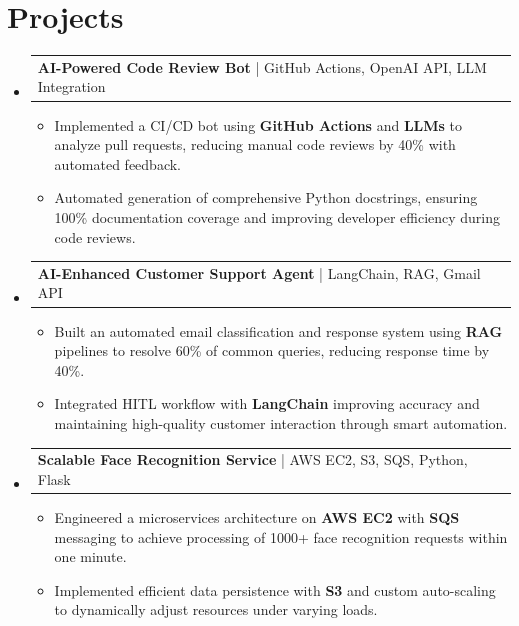 \documentclass[letterpaper,11pt]{article}
\makeatletter
\newcommand{\resumeItem}[1]{
  \item\footnotesize{
    {#1 \vspace{-2pt}}
  }
}
\newcommand{\resumeProjectHeading}[2]{
    \item
    \begin{tabular*}{1.001\textwidth}{l@{\extracolsep{\fill}}r}
      \small#1 & \textbf{\small #2}\\
    \end{tabular*}\vspace{-7pt}
}
\newcommand{\resumeSubHeadingListStart}{\begin{itemize}[leftmargin=0pt, label={}]}
\newcommand{\resumeSubHeadingListEnd}{\end{itemize}}
\newcommand{\resumeItemListStart}{\begin{itemize}[leftmargin=*]}
\newcommand{\resumeItemListEnd}{\end{itemize}\vspace{-5pt}}
\makeatother
\begin{document}
\section{Projects}
    \vspace{-5pt}
    \resumeSubHeadingListStart
          \resumeProjectHeading
              {\textbf{AI-Powered Code Review Bot} | GitHub Actions, OpenAI API, LLM Integration}{}
        \resumeItemListStart
            \resumeItem{Implemented a CI/CD bot using \textbf{GitHub Actions} and \textbf{LLMs} to analyze pull requests, reducing manual code reviews by 40\% with automated feedback.}
            \resumeItem{Automated generation of comprehensive Python docstrings, ensuring 100\% documentation coverage and improving developer efficiency during code reviews.}
        \resumeItemListEnd
        \vspace{-12pt}
    
    \resumeProjectHeading
        {\textbf{AI-Enhanced Customer Support Agent} | LangChain, RAG, Gmail API}{}
        \resumeItemListStart
            \resumeItem{Built an automated email classification and response system using \textbf{RAG} pipelines to resolve 60\% of common queries, reducing response time by 40\%.}
            \resumeItem{Integrated HITL workflow with \textbf{LangChain} improving accuracy and maintaining high-quality customer interaction through smart automation.}
        \resumeItemListEnd
          \vspace{-12pt}
      \resumeProjectHeading
          {\textbf{Scalable Face Recognition Service} | AWS EC2, S3, SQS, Python, Flask}{}
          \resumeItemListStart
              \resumeItem{Engineered a microservices architecture on \textbf{AWS EC2} with \textbf{SQS} messaging to achieve processing of 1000+ face recognition requests within one minute.}
              \resumeItem{Implemented efficient data persistence with \textbf{S3} and custom auto-scaling to dynamically adjust resources under varying loads.}
          \resumeItemListEnd 
    \resumeSubHeadingListEnd
\end{document}
